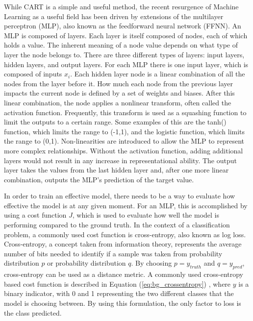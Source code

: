 	\par While CART is a simple and useful method, the recent resurgence of Machine Learning as a useful field has been driven by extensions of the multilayer perceptron (MLP)\cite{deepLearningSurvey}, also known as the feedforward neural network (FFNN). An MLP is composed of layers. Each layer is itself composed of nodes, each of which holds a value. The inherent meaning of a node value depends on what type of layer the node belongs to. There are three different types of layers: input layers, hidden layers, and output layers. For each MLP there is one input layer, which is composed of inputs $x_i$. Each hidden layer node is a linear combination of all the nodes from the layer before it. How much each node from the previous layer impacts the current node is defined by a set of weights and biases. After this linear combination, the node applies a nonlinear transform, often called the activation function. Frequently, this transform is used as a squashing function to limit the outputs to a certain range\cite{sigmoidReason}. Some examples of this are the tanh() function, which limits the range to (-1,1), and the logistic function, which limits the range to (0,1). Non-linearities are introduced to allow the MLP to represent more complex relationships. Without the activation function, adding additional layers would not result in any increase in representational ability. The output layer takes the values from the last hidden layer and, after one more linear combination, outputs the MLP's prediction of the target value. 
	\par In order to train an effective model, there needs to be a way to evaluate how effective the model is at any given moment. For an MLP, this is accomplished by using a cost function $J$, which is used to evaluate how well the model is performing compared to the ground truth. In the context of a classification problem, a commonly used cost function is cross-entropy, also known as log loss. Cross-entropy, a concept taken from information theory, represents the average number of bits needed to identify if a sample was taken from probability distribution $p$ or probability distribution $q$. By choosing $p=y_{truth}$ and $q=y_{pred}$, cross-entropy can be used as a distance metric. A commonly used cross-entropy based cost function is described in Equation (\ref{eq:bg_crossentropy}) \cite{lossFcns}, where $y$ is a binary indicator, with 0 and 1 representing the two different classes that the model is choosing between. By using this formulation, the only factor to loss is the class predicted. 
